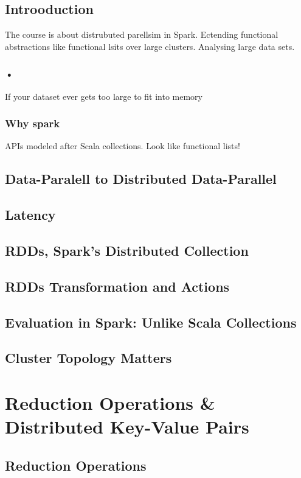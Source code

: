 \documentclass[10pt, a4paper]{report}
\begin{document}
\section{Introoduction}

The course is about distrubuted parellsim in Spark. Ectending functional abstractions like functional lsits over large clusters. Analysing large data sets.

\subsection{•}
If your dataset ever gets too large to fit into memory

\subsection{Why spark}
APIs modeled after Scala collections. Look like functional lists! 

\section{Data-Paralell to Distributed Data-Parallel}
\section{Latency}
\section{RDDs, Spark's Distributed Collection}
\section{RDDs Transformation and Actions}
\section{Evaluation in Spark: Unlike Scala Collections}
\section{Cluster Topology Matters}


\chapter{Reduction Operations \& Distributed Key-Value Pairs}

\section{Reduction Operations}
\end{document}
